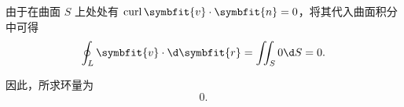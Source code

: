\begin{solution}
    由于在曲面 $S$ 上处处有 $\operatorname{curl} \symbfit{v} \cdot \symbfit{n} = 0$，将其代入曲面积分中可得
    \begin{equation}
        \label{eq:result-integral}
        \oint_L \symbfit{v} \cdot \d\symbfit{r} = \iint_S 0 \d S = 0.
    \end{equation}

    因此，所求环量为
    \begin{equation}
        \label{eq:final-answer}
        \boxed{0}.
    \end{equation}
\end{solution}

\endinput
